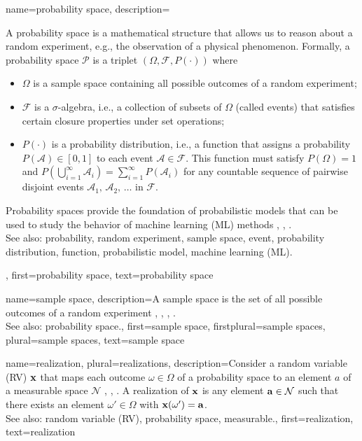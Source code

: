 { 
 {name={probability space}, 
 	description={A probability space is a mathematical 
 		structure that allows us to reason about a random experiment, e.g., the observation 
		of a physical phenomenon. 
 	   	Formally, a probability space $\mathcal{P}$ is a triplet $(\Omega, \mathcal{F}, P\left(\cdot\right))$ where
 		\begin{itemize} 
 			\item  $\Omega$ is a sample space containing all possible outcomes of a random experiment;
 			\item  $\mathcal{F}$ is a $\sigma$-algebra, i.e., a collection of subsets of 
			$\Omega$ (called events) that satisfies certain closure properties under set operations;
 			\item $P\left(\cdot\right)$ is a probability distribution, i.e., a function that assigns a probability $P(\mathcal{A}) \in [0,1]$ 
 			to each event $\mathcal{A} \in \mathcal{F}$. This function must satisfy $P\left(\Omega\right) = 1$ and 
			$P\left(\bigcup_{i=1}^{\infty} \mathcal{A}_i\right) = \sum_{i=1}^{\infty} P\left(\mathcal{A}_i\right)$ for any 
 			countable sequence of pairwise disjoint events $\mathcal{A}_1, \,\mathcal{A}_2, \,\ldots$ in $\mathcal{F}$.
 		\end{itemize}
 		Probability spaces provide the foundation of probabilistic models that can be 
		used to study the behavior of machine learning (ML) methods \cite{BillingsleyProbMeasure}, \cite{GrayProbBook}, \cite{ross2013first}.
				\\
		See also: probability, random experiment, sample space, event, probability distribution, function, probabilistic model, machine learning (ML).},  
 	first={probability space}, 
 	text={probability space}
 }
 
 
  {name={sample space}, 
  	description={A sample space is the set of all possible 
		outcomes of a random experiment \cite{BillingsleyProbMeasure}, 
		\cite{BertsekasProb}, \cite{papoulis}, \cite{AshProbMeasure}. 
		\\
 		See also: probability space.},  
  	first={sample space}, 
 	firstplural={sample spaces},
 	plural={sample spaces},
  	text={sample space}
  }
 
	
{name={realization}, plural={realizations},
	description={Consider a random variable (RV) ${\bf x}$ that maps each outcome 
		$\omega \in \Omega$ of a probability space to an element $a$ of a 
		measurable space $\mathcal{N}$ \cite{RudinBookPrinciplesMatheAnalysis}, \cite{BillingsleyProbMeasure}, \cite{HalmosMeasure}. 
		A realization of ${\bf x}$ is any element ${\bf a} \in \mathcal{N}$ such that there exists 
		an element $\omega' \in \Omega$ with ${\bf x}(\omega') = {\bf a}$.
			\\
		See also: random variable (RV), probability space, measurable.}, 
	first={realization},
	text={realization}  
}

}

